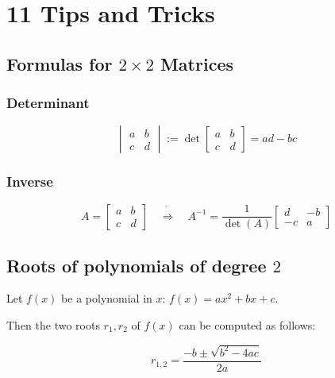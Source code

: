 \section*{11 Tips and Tricks}

\subsection{Formulas for \texorpdfstring{$2\times 2$}{2x2} Matrices}

\subsubsection{Determinant}
\begin{equation*}
    \begin{vmatrix}
        a & b \\ c & d
    \end{vmatrix}
    :=
    \det\begin{bmatrix}
        a & b \\ c & d
    \end{bmatrix}
    =ad-bc
\end{equation*}

\subsubsection{Inverse}
\begin{equation*}
    A=
    \begin{bmatrix}
        a & b \\ c & d
    \end{bmatrix}
    \quad \dot\Longrightarrow \quad
    A^{-1}=
    \frac{1}{\det(A)}
    \begin{bmatrix}
        d & -b \\ -c & a
    \end{bmatrix}
\end{equation*}

\subsection{Roots of polynomials of degree \texorpdfstring{$2$}{2}}

Let $f(x)$ be a polynomial in $x$: $f(x)=ax^2+bx+c$.

Then the two roots $r_1,r_2$ of $f(x)$ can be computed as follows:

\begin{equation*}
    r_{1,2}=\frac{-b\pm\sqrt{b^2-4ac}}{2a}
\end{equation*}

